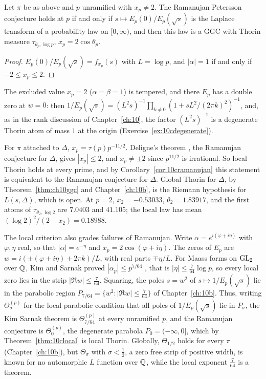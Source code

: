 \begin{corollary}\label{cor:10cramanujan}
Let $\pi$ be as above and $p$ unramified with $x_p\ne2$. The Ramanujan Petersson conjecture holds at $p$ if and only if $s\mapsto E_p(0)/E_p(\sqrt s)$ is the Laplace transform of a probability law on $[0,\infty)$, and then this law is a GGC with Thorin measure $\tau_{\theta_p,\log p}$, $x_p=2\cos\theta_p$.
\end{corollary}

\begin{proof}
$E_p(0)/E_p(\sqrt s)=f_{x_p}(s)$ with $L=\log p$, and $|\alpha|=1$ if and only if $-2\le x_p\le2$.
\end{proof}

The excluded value $x_p=2$ ($\alpha=\beta=1$) is tempered, and there $E_p$ has a double zero at $w=0$: then $1/E_p(\sqrt s)=(L^2s)^{-1}\prod_{k\ne0}(1+sL^2/(2\pi k)^2)^{-1}$, and, as in the rank discussion of Chapter~\ref{ch:10}, the factor $(L^2s)^{-1}$ is a degenerate Thorin atom of mass $1$ at the origin (Exercise~\ref{ex:10cdegenerate}).

\begin{example}
For $\pi$ attached to $\Delta$, $x_p=\tau(p)p^{-11/2}$. Deligne's theorem \cite{deligne1974}, the Ramanujan conjecture for $\Delta$, gives $|x_p|\le2$, and $x_p\ne\pm2$ since $p^{11/2}$ is irrational. So local Thorin holds at every prime, and by Corollary~\ref{cor:10cramanujan} this statement is equivalent to the Ramanujan conjecture for $\Delta$. Global Thorin for $\Delta$, by Theorem~\ref{thm:ch10ggc} and Chapter~\ref{ch:10b}, is the Riemann hypothesis for $L(s,\Delta)$, which is open. At $p=2$, $x_2=-0.53033$, $\theta_2=1.83917$, and the first atoms of $\tau_{\theta_2,\log2}$ are $7.0403$ and $41.105$; the local law has mean $(\log2)^2/(2-x_2)=0.18988$.
\end{example}

The local criterion also grades failures of Ramanujan. Write $\alpha=e^{i(\varphi+i\eta)}$ with $\varphi,\eta$ real, so that $|\alpha|=e^{-\eta}$ and $x_p=2\cos(\varphi+i\eta)$. The zeros of $E_p$ are $w=i(\pm(\varphi+i\eta)+2\pi k)/L$, with real parts $\mp\eta/L$. For Maass forms on $\mathrm{GL}_2$ over $\mathbb{Q}$, Kim and Sarnak proved $|\alpha_p|\le p^{7/64}$ \cite{kimsarnak2003}, that is $|\eta|\le\frac{7}{64}\log p$, so every local zero lies in the strip $|\Re w|\le\frac{7}{64}$. Squaring, the poles $s=w^2$ of $s\mapsto1/E_p(\sqrt s)$ lie in the parabolic region $P_{7/64}=\{w^2:|\Re w|\le\frac7{64}\}$ of Chapter~\ref{ch:10b}. Thus, writing $\Theta^{(p)}_\sigma$ for the local parabolic condition that all poles of $1/E_p(\sqrt s)$ lie in $P_\sigma$, the Kim Sarnak theorem is $\Theta^{(p)}_{7/64}$ at every unramified $p$, and the Ramanujan conjecture is $\Theta^{(p)}_0$, the degenerate parabola $P_0=(-\infty,0]$, which by Theorem~\ref{thm:10clocal} is local Thorin. Globally, $\Theta_{1/2}$ holds for every $\pi$ (Chapter~\ref{ch:10b}), but $\Theta_\sigma$ with $\sigma<\frac12$, a zero free strip of positive width, is known for no automorphic $L$ function over $\mathbb{Q}$, while the local exponent $\frac{7}{64}$ is a theorem.

